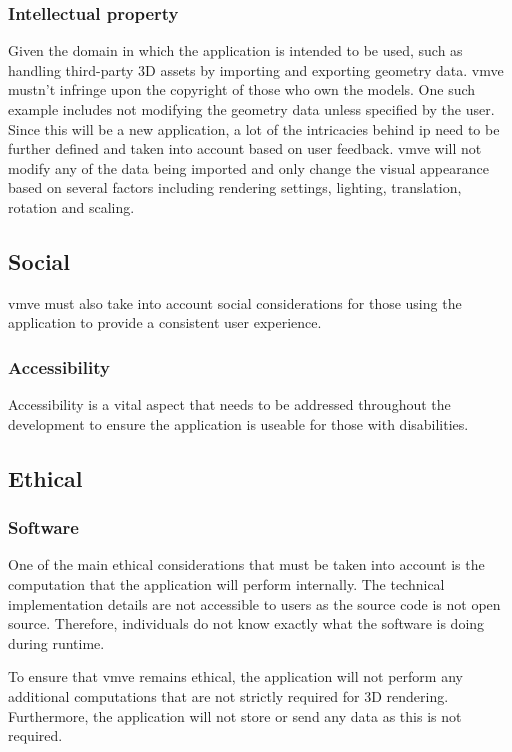 \documentclass[11pt]{article}
\begin{document}
\subsubsection{Intellectual property}
Given the domain in which the application is intended to be used, such as
handling third-party 3D assets by importing and exporting geometry data.
\gls{vmve} mustn't infringe upon the copyright of those who own the models. One
such example includes not modifying the geometry data unless specified by the
user. Since this will be a new application, a lot of the intricacies behind
\gls{ip} need to be further defined and taken into account based on user
feedback. \gls{vmve} will not modify any of the data being imported and only
change the visual appearance based on several factors including rendering
settings, lighting, translation, rotation and scaling. 

\subsection{Social}
\gls{vmve} must also take into account social considerations for those using the
application to provide a consistent user experience.

\subsubsection{Accessibility}
Accessibility is a vital aspect that needs to be addressed throughout the
development to ensure the application is useable for those with disabilities.

\subsection{Ethical}


\subsubsection{Software}
One of the main ethical considerations that must be taken into account is the
computation that the application will perform internally. The technical
implementation details are not accessible to users as the source code is not
open source. Therefore, individuals do not know exactly what the software is
doing during runtime.

To ensure that \gls{vmve} remains ethical, the application will not perform any
additional computations that are not strictly required for 3D rendering.
Furthermore, the application will not store or send any data as this is not
required.
\end{document}
